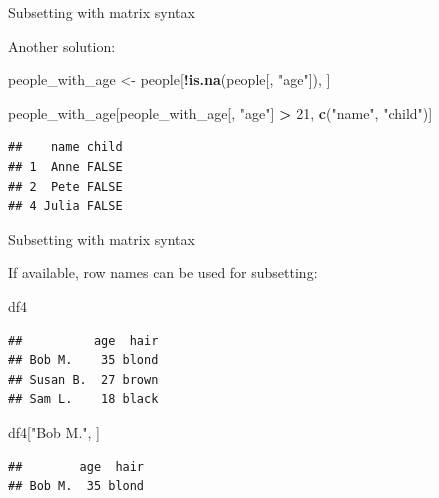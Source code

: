 \documentclass[ignorenonframetext,]{beamer}
\newenvironment{Shaded}{\begin{snugshade}}{\end{snugshade}}
\newcommand{\DecValTok}[1]{\textcolor[rgb]{0.00,0.00,0.81}{#1}}
\newcommand{\KeywordTok}[1]{\textcolor[rgb]{0.13,0.29,0.53}{\textbf{#1}}}
\newcommand{\NormalTok}[1]{#1}
\newcommand{\OperatorTok}[1]{\textcolor[rgb]{0.81,0.36,0.00}{\textbf{#1}}}
\newcommand{\StringTok}[1]{\textcolor[rgb]{0.31,0.60,0.02}{#1}}
\begin{document}
\begin{frame}[fragile]{Subsetting with matrix syntax}
\protect\hypertarget{subsetting-with-matrix-syntax-11}{}

Another solution:

\begin{Shaded}
\begin{Highlighting}[]
\NormalTok{people_with_age <-}\StringTok{ }\NormalTok{people[}\OperatorTok{!}\KeywordTok{is.na}\NormalTok{(people[, }\StringTok{"age"}\NormalTok{]), ]}

\NormalTok{people_with_age[people_with_age[, }\StringTok{"age"}\NormalTok{] }\OperatorTok{>}\StringTok{ }\DecValTok{21}\NormalTok{,}
  \KeywordTok{c}\NormalTok{(}\StringTok{"name"}\NormalTok{, }\StringTok{"child"}\NormalTok{)]}
\end{Highlighting}
\end{Shaded}

\begin{verbatim}
##    name child
## 1  Anne FALSE
## 2  Pete FALSE
## 4 Julia FALSE
\end{verbatim}

\end{frame}

\begin{frame}[fragile]{Subsetting with matrix syntax}
\protect\hypertarget{subsetting-with-matrix-syntax-12}{}

If available, row names can be used for subsetting:

\begin{Shaded}
\begin{Highlighting}[]
\NormalTok{df4}
\end{Highlighting}
\end{Shaded}

\begin{verbatim}
##          age  hair
## Bob M.    35 blond
## Susan B.  27 brown
## Sam L.    18 black
\end{verbatim}

\begin{Shaded}
\begin{Highlighting}[]
\NormalTok{df4[}\StringTok{"Bob M."}\NormalTok{, ]}
\end{Highlighting}
\end{Shaded}

\begin{verbatim}
##        age  hair
## Bob M.  35 blond
\end{verbatim}

\end{frame}
\end{document}
